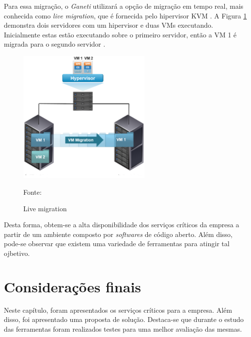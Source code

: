 Para essa migração, o \textit{Ganeti} utilizará a opção de migração em tempo real, mais conhecida como \textit{live migration}, que é fornecida 
pelo hipervisor \ac{KVM} \cite{kvm}. A Figura \ref{fig:vms_migration} demonstra dois servidores com um hipervisor e duas \acp{VM} executando. 
Inicialmente estas estão executando sobre o primeiro servidor, então a \ac{VM} 1 é migrada para o segundo servidor \cite{livemigration}.

\begin{figure}[h!]
 \centering
 \includegraphics[width=250px]{img/vms_migration.eps}
 \caption{Live migration}
 Fonte: \citet{spaniol2015}
 \label{fig:vms_migration}
\end{figure}

Desta forma, obtem-se a alta disponibilidade dos serviços críticos da empresa a partir de um ambiente composto por \textit{softwares} de código 
aberto. Além disso, pode-se observar que existem uma variedade de ferramentas para atingir tal ojbetivo.

% 
% 
% 
% 


\section{Considerações finais}

Neste capítulo, foram apresentados os serviços críticos para a empresa. Além disso, foi apresentado uma proposta de solução. Destaca-se que 
durante o estudo das ferramentas foram realizados testes para uma melhor avaliação das mesmas.


